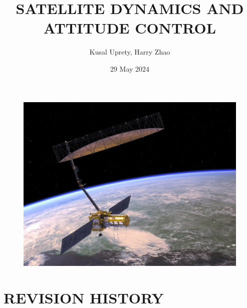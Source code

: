 \documentclass[12pt,a4paper,notitlepage]{article}
\begin{document}
\title{\Huge \textbf{SATELLITE DYNAMICS AND ATTITUDE CONTROL}}
\author{Kusal Uprety, Harry Zhao}
\date{29 May 2024}

\begin{minipage}[h]{\textwidth}
	\vspace{4 cm}
	\advance\leftskip-1in
    \maketitle
\end{minipage}

\begin{figure}[H]
\centering
\includegraphics[scale=0.45]{Images/NISAR.jpg}
\end{figure}

\pagebreak

\section*{\Large REVISION HISTORY}
\end{document}
